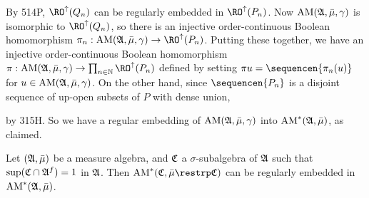 {

\medskip

 By 514P, $\RO^{\uparrow}(Q_n)$ can be regularly embedded
in
$\RO^{\uparrow}(P_n)$.   Now $\mathop{\text{AM}}(\frak A,\bar\mu,\gamma)$ is isomorphic
to $\RO^{\uparrow}(Q_n)$, so there is an injective
order-continuous Boolean homomorphism
$\pi_n:\AM(\frak A,\bar\mu,\gamma)\to\RO^{\uparrow}(P_n)$.
Putting these together, we have an injective order-continuous Boolean
homomorphism $\pi:\AM(\frak A,\bar\mu,\gamma)
\to\prod_{n\in\Bbb N}\RO^{\uparrow}(P_n)$ defined by setting
$\pi u=\sequencen{\pi_n(u)}$ for $u\in\mathop{\text{AM}}(\frak A,\bar\mu,\gamma)$.
On the other hand, since $\sequencen{P_n}$ is a disjoint sequence of
up-open subsets of $P$ with dense union,


\noindent by 315H.   So we have a regular embedding of
$\mathop{\text{AM}}(\frak A,\bar\mu,\gamma)$ into $\mathop{\text{AM}}^*(\frak A,\bar\mu)$, as claimed.
}%

 Let $(\frak A,\bar\mu)$ be a
measure algebra, and $\frak C$ a $\sigma$-subalgebra of $\frak A$
such that $\sup(\frak C\cap\frak A^f)=1$ in $\frak A$.   Then
$\AM^*(\frak C,\bar\mu\restrp\frak C)$ can be regularly embedded in
$\mathop{\text{AM}}^*(\frak A,\bar\mu)$.

